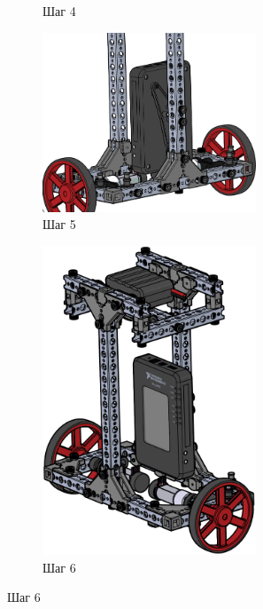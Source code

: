 \begin{figure}[h!]
\begin{subfigure}[b]{0.45\textwidth}
        \caption*{Шаг 4}
    \end{subfigure}
    \begin{subfigure}[b]{0.45\textwidth}
        \centering
        \includegraphics[width=0.7\textwidth]{fig/assembly/3.5.png}
        \caption*{Шаг 5}
    \end{subfigure}
    \begin{subfigure}[b]{0.45\textwidth}
        \flushright
        \includegraphics[width=0.7\textwidth]{fig/assembly/3.6.png}
        \caption*{Шаг 6}
    \end{subfigure}
\end{figure}
\clearpage

